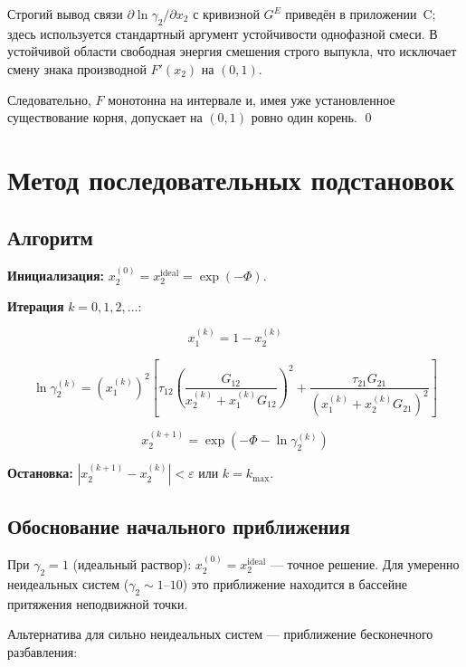 \documentclass[11pt]{article}
\begin{document}
Строгий вывод связи $\partial\ln\gamma_2/\partial x_2$ с кривизной $G^E$ приведён в приложении~C; здесь используется стандартный аргумент устойчивости однофазной смеси. В устойчивой области свободная энергия смешения строго выпукла, что исключает смену знака производной $F'(x_2)$ на $(0,1)$.

Следовательно, $F$ монотонна на интервале и, имея уже установленное существование корня, допускает на $(0,1)$ ровно один корень. \qed

\section{Метод последовательных подстановок}

\subsection{Алгоритм}

\textbf{Инициализация:} $x_2^{(0)} = x_2^{\mathrm{ideal}} = \exp(-\Phi)$.

\textbf{Итерация} $k = 0, 1, 2, \ldots$:

\begin{equation*}
x_1^{(k)} = 1 - x_2^{(k)}
\end{equation*}

\begin{equation*}
\ln \gamma_2^{(k)} = (x_1^{(k)})^2 \left[\tau_{12}\!\left(\frac{G_{12}}{x_2^{(k)} + x_1^{(k)} G_{12}}\right)^{2} + \frac{\tau_{21}G_{21}}{(x_1^{(k)} + x_2^{(k)} G_{21})^2}\right]
\end{equation*}

\begin{equation*}
x_2^{(k+1)} = \exp\!\left(-\Phi - \ln \gamma_2^{(k)}\right)
\end{equation*}

\textbf{Остановка:} $|x_2^{(k+1)} - x_2^{(k)}| < \varepsilon$ или $k = k_{\max}$.

\subsection{Обоснование начального приближения}

При $\gamma_2 = 1$ (идеальный раствор): $x_2^{(0)} = x_2^{\mathrm{ideal}}$ --- точное решение. Для умеренно неидеальных систем ($\gamma_2 \sim 1$--$10$) это приближение находится в бассейне притяжения неподвижной точки.

Альтернатива для сильно неидеальных систем --- приближение бесконечного разбавления:
\end{document}
